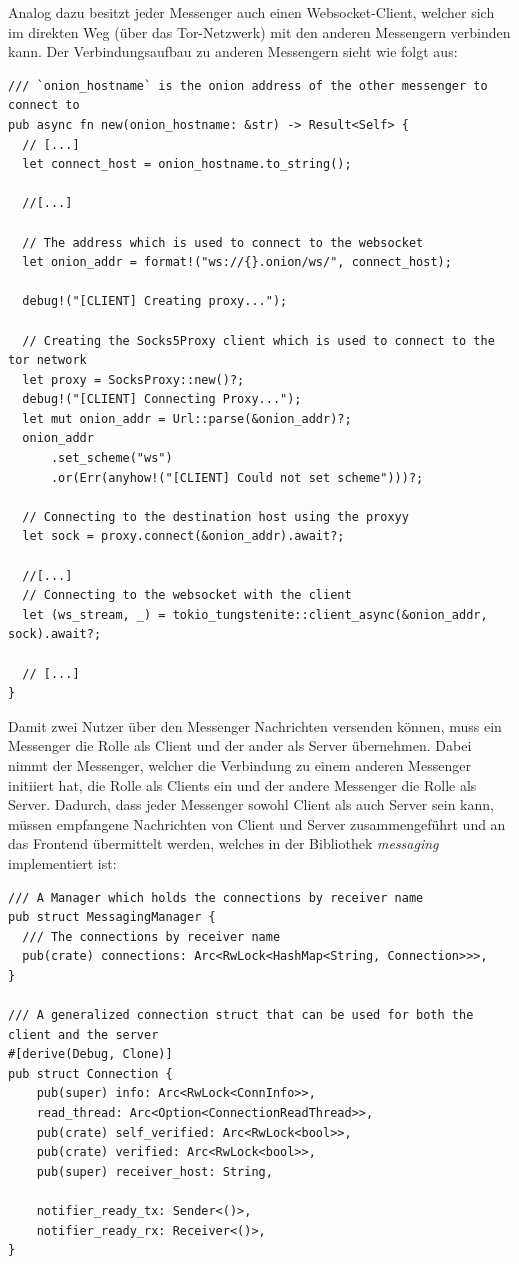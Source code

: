 \documentclass[a4paper,ngerman, headheight=28pt,12pt]{scrartcl}
\begin{document}
Analog dazu besitzt jeder Messenger auch einen Websocket-Client, welcher sich im direkten Weg (über das Tor-Netzwerk) mit den anderen Messengern verbinden kann. Der Verbindungsaufbau zu anderen Messengern sieht wie folgt aus:
\begin{verbatim}
/// `onion_hostname` is the onion address of the other messenger to connect to
pub async fn new(onion_hostname: &str) -> Result<Self> {
  // [...]
  let connect_host = onion_hostname.to_string();

  //[...]

  // The address which is used to connect to the websocket
  let onion_addr = format!("ws://{}.onion/ws/", connect_host);

  debug!("[CLIENT] Creating proxy...");

  // Creating the Socks5Proxy client which is used to connect to the tor network
  let proxy = SocksProxy::new()?;
  debug!("[CLIENT] Connecting Proxy...");
  let mut onion_addr = Url::parse(&onion_addr)?;
  onion_addr
      .set_scheme("ws")
      .or(Err(anyhow!("[CLIENT] Could not set scheme")))?;

  // Connecting to the destination host using the proxyy
  let sock = proxy.connect(&onion_addr).await?;

  //[...]
  // Connecting to the websocket with the client
  let (ws_stream, _) = tokio_tungstenite::client_async(&onion_addr, sock).await?;

  // [...]
}
\end{verbatim}
Damit zwei Nutzer über den Messenger Nachrichten versenden können, muss ein Messenger die Rolle als Client und der ander als Server übernehmen. Dabei nimmt der Messenger, welcher die Verbindung zu einem anderen Messenger initiiert hat, die Rolle als Clients ein und der andere Messenger die Rolle als Server. Dadurch, dass jeder Messenger sowohl Client als auch Server sein kann, müssen empfangene Nachrichten von Client und Server zusammengeführt und an das Frontend übermittelt werden, welches in der Bibliothek \textit{messaging} implementiert ist:
\begin{verbatim}
/// A Manager which holds the connections by receiver name
pub struct MessagingManager {
  /// The connections by receiver name
  pub(crate) connections: Arc<RwLock<HashMap<String, Connection>>>,
}

/// A generalized connection struct that can be used for both the client and the server
#[derive(Debug, Clone)]
pub struct Connection {
    pub(super) info: Arc<RwLock<ConnInfo>>,
    read_thread: Arc<Option<ConnectionReadThread>>,
    pub(crate) self_verified: Arc<RwLock<bool>>,
    pub(crate) verified: Arc<RwLock<bool>>,
    pub(super) receiver_host: String,

    notifier_ready_tx: Sender<()>,
    notifier_ready_rx: Receiver<()>,
}
\end{verbatim}
\end{document}
